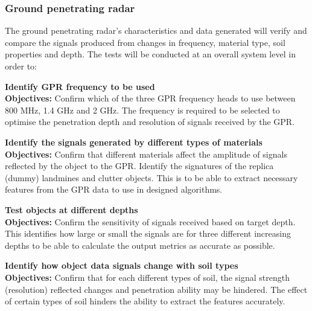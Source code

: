\documentclass[main.tex]{subfiles}
\begin{document}
\begin{appendices}
\subsubsection{Ground penetrating radar}
The ground penetrating radar’s characteristics and data generated will verify  and compare the signals produced from changes in frequency, material type, soil properties and depth. The tests will be conducted at an overall system level in order to:
\begin{gpr}
\textbf{Identify GPR frequency to be used}\\
\textbf{Objectives:} Confirm which of the three GPR frequency heads to use between 800 MHz, 1.4 GHz and 2 GHz. The frequency is required to be selected to optimise the penetration depth and resolution of signals received by the GPR. 
\end{gpr}
\begin{gpr}
\textbf{Identify the signals generated by different types of materials}\\
\textbf{Objectives:} Confirm that different materials affect the amplitude of signals reflected by the object to the GPR. Identify the signatures of the replica (dummy) landmines and clutter objects. This is to be able to extract necessary features from the GPR data to use in designed algorithms. 
\end{gpr}

\begin{gpr}
\textbf{Test objects at different depths}\\
\textbf{Objectives:} Confirm the sensitivity of signals received based on target depth. This identifies how large or small the signals are for three different increasing depths to be able to calculate the output metrics as accurate as possible. 
\end{gpr}
\begin{gpr}
\textbf{Identify how object data signals change with soil types}\\
\textbf{Objectives:} Confirm that for each different types of soil,  the signal strength (resolution) reflected changes and penetration ability may be hindered. The effect of certain types of soil hinders the ability to extract the features accurately. 
\end{gpr}


\end{appendices}
\end{document}

